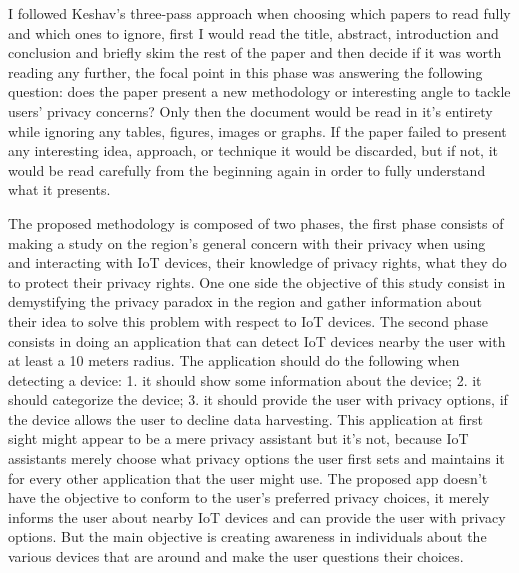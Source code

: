 \documentclass[conference]{IEEEtran}
\begin{document}
I followed Keshav's three-pass approach \cite{KeshavHow} when choosing which
papers to read fully and which ones to ignore, first I would read the title, abstract,
introduction and conclusion and briefly skim the rest of the paper and then
decide if it was worth reading any further, the focal point in this phase was
answering the following question: does the paper present a new methodology or
interesting angle to tackle users' privacy concerns? Only then the document would
be read in it's entirety while ignoring any tables, figures, images or graphs.
If the paper failed to present any interesting idea, approach, or
technique it would be discarded, but if not, it would be read carefully from
the beginning again in order to fully understand what it presents.




The proposed methodology is composed of two phases, the first phase consists of
making a study on the region's general concern with their privacy when
using and interacting with IoT devices, their knowledge of privacy rights, what they do to
protect their privacy rights. One one side the objective of this study
consist in demystifying the privacy paradox in the region and gather
information about their idea to solve this problem with respect
to IoT devices.
The second phase consists in doing an application that can detect IoT devices
nearby the user with at least a 10 meters radius. The application should
do the following when detecting a device:
1. it should show some information about the device;
2. it should categorize the device;
3. it should provide the user with privacy options, if the device allows the
user to decline data harvesting.
This application at first sight might appear to be a mere privacy assistant but
it's not, because IoT assistants merely choose what privacy options
the user first sets and maintains it for every other application that the user
might use. The proposed app doesn't have the objective to conform to the
user's preferred privacy choices, it merely informs the user about nearby IoT
devices and can provide the user with privacy options. But the main objective
is creating awareness in individuals about the various devices that are around
and make the user questions their choices.
\end{document}
